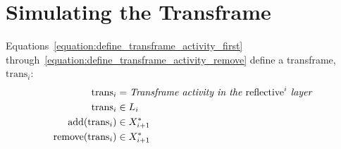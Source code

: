 \section{Simulating the Transframe}

Equations~\ref{equation:define_transframe_activity_first}
through~\ref{equation:define_transframe_activity_remove} define a
transframe, $\text{trans}_i$:
\begin{align}
\label{equation:define_transframe_activity_first}
                  \text{trans}_i &= \text{\emph{Transframe activity in the} reflective}^i\text{\emph{ layer}} \\
                  \text{trans}_i &\in L_i \\
\label{equation:define_transframe_activity_add}
   \text{add}(\text{trans}_i) &\in X_{i+1}^* \\
\label{equation:define_transframe_activity_remove}
\text{remove}(\text{trans}_i) &\in X_{i+1}^*
\end{align}

%



